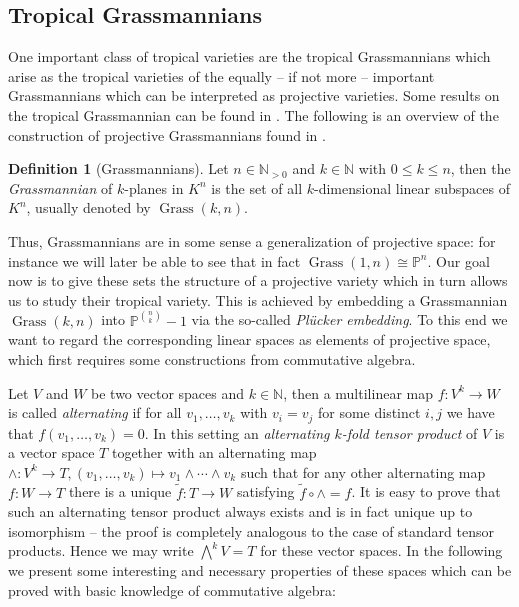 \documentclass[
  paper=a4,
  titlepage,
  bibliography=totoc,
  listof=totoc,
  pagesize=pdftex
]{scrartcl}
\numberwithin{figure}{section}
\numberwithin{equation}{section}
\numberwithin{table}{section}
\newcommand*\setN{\mathds{N}}
\newcommand*\setP{\mathds{P}}
\DeclareMathOperator{\Grass}{Grass}
\theoremstyle{definition}
\newtheorem{definition}{Definition}
\numberwithin{definition}{section}
\begin{document}
\subsection{Tropical Grassmannians}

One important class of tropical varieties are the tropical Grassmannians which arise as
the tropical varieties of the equally -- if not more -- important Grassmannians which can
be interpreted as projective varieties. Some results on the tropical Grassmannian can be
found in \cite{tropGrass}. The following is an overview of the construction of projective
Grassmannians found in \cite[Section~8]{gathmAlgGeo}. %

\begin{definition}[Grassmannians]
  Let $n \in \setN_{>0}$ and $k \in \setN$ with $0 \leq k \leq n$, then the
  \emph{Grassmannian} of $k$-planes in $K^n$ is the set of all $k$-dimensional linear
  subspaces of $K^n$, usually denoted by $\Grass(k, n)$.
\end{definition}

Thus, Grassmannians are in some sense a generalization of projective space: for instance
we will later be able to see that in fact $\Grass(1,n) \cong \setP^n$. Our goal now is to
give these sets the structure of a projective variety which in turn allows us to study
their tropical variety. This is achieved by embedding a Grassmannian $\Grass(k, n)$ into
$\setP^{\binom nk}-1$ via the so-called \emph{Plücker embedding}. To this end we want to
regard the corresponding linear spaces as elements of projective space, which first
requires some constructions from commutative algebra.

Let $V$ and $W$ be two vector spaces and $k\in\setN$, then a multilinear map $f : V^k \to
W$ is called \emph{alternating} if for all $v_1, \dots, v_k$ with $v_i=v_j$ for some
distinct $i,j$ we have that $f(v_1, \dots, v_k) = 0$. In this setting an \emph{alternating
$k$-fold tensor product} of $V$ is a vector space $T$ together with an alternating map
$\wedge:V^k\to T, (v_1, \dots, v_k) \mapsto v_1\wedge\cdots\wedge v_k$ such that for any
other alternating map $f:W\to T$ there is a unique $\tilde f:T\to W$ satisfying $\tilde f
\circ \wedge = f$. It is easy to prove that such an alternating tensor product always
exists and is in fact unique up to isomorphism -- the proof is completely analogous to the
case of standard tensor products. Hence we may write $\bigwedge^k V = T$ for these vector
spaces. In the following we present some interesting and necessary properties of these
spaces which can be proved with basic knowledge of commutative algebra:
\end{document}
